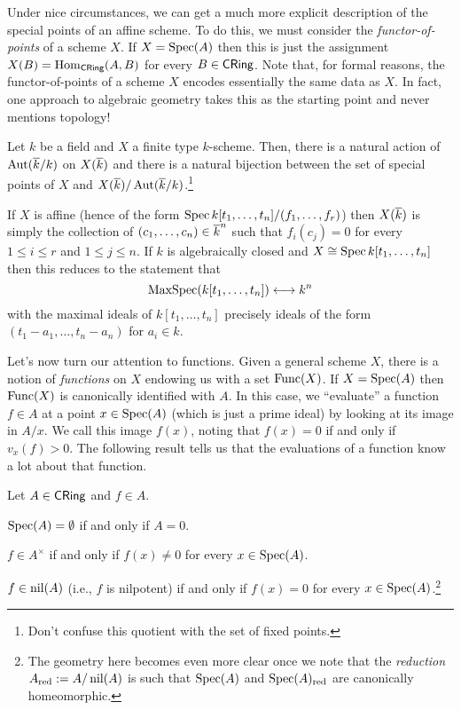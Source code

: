 \documentclass[11pt]{article}
\begin{document}
Under nice circumstances, we can get a much more explicit description of the special points of an affine scheme. To do this, we must consider the \emph{functor-of-points} of a scheme $X$. If $X=\operatorname{Spec}(A)$ then this is just the assignment $X(B)=\operatorname{Hom}_{\operatorname{\mathsf{CRing}}}(A,B)$ for every $B\in\operatorname{\mathsf{CRing}}$. Note that, for formal reasons, the functor-of-points of a scheme $X$ encodes essentially the same data as $X$. In fact, one approach to algebraic geometry takes this as the starting point and never mentions topology!

\begin{proposition}
Let $k$ be a field and $X$ a finite type $k$-scheme. Then, there is a natural action of $\operatorname{Aut}(\overline{k}/k)$ on $X(\overline{k})$ and there is a natural bijection between the set of special points of $X$ and $X(\overline{k})/\operatorname{Aut}(\overline{k}/k)$.\footnote{Don't confuse this quotient with the set of fixed points.}
\end{proposition}

If $X$ is affine (hence of the form $\operatorname{Spec} k[t_1,\ldots,t_n]/(f_1,\ldots,f_r)$) then $X(\overline{k})$ is simply the collection of $(c_1,\ldots,c_n)\in\overline{k}^n$ such that $f_i(c_j)=0$ for every $1\leq i\leq r$ and $1\leq j\leq n$. If $k$ is algebraically closed and $X\cong\operatorname{Spec} k[t_1,\ldots,t_n]$ then this reduces to the statement that 
$$\operatorname{MaxSpec}(k[t_1,\ldots,t_n])\longleftrightarrow k^n$$ 
with the maximal ideals of $k[t_1,\ldots,t_n]$ precisely ideals of the form $(t_1-a_1,\ldots,t_n-a_n)$ for $a_i\in k$.

Let's now turn our attention to functions. Given a general scheme $X$, there is a notion of \emph{functions} on $X$ endowing us with a set $\operatorname{Func}(X)$. If $X=\operatorname{Spec}(A)$ then $\operatorname{Func}(X)$ is canonically identified with $A$. In this case, we ``evaluate'' a function $f\in A$ at a point $x\in\operatorname{Spec}(A)$ (which is just a prime ideal) by looking at its image in $A/x$. We call this image $f(x)$, noting that $f(x)=0$ if and only if $v_x(f)>0$. The following result tells us that the evaluations of a function know a lot about that function.

\begin{proposition}
Let $A\in\operatorname{\mathsf{CRing}}$ and $f\in A$.
\begin{enum}{\alph}
\item $\operatorname{Spec}(A)=\emptyset$ if and only if $A=0$.

\item $f\in A^{\times}$ if and only if $f(x)\neq0$ for every $x\in\operatorname{Spec}(A)$.

\item $f\in\operatorname{nil}(A)$ (i.e., $f$ is nilpotent) if and only if $f(x)=0$ for every $x\in\operatorname{Spec}(A)$.\footnote{The geometry here becomes even more clear once we note that the \emph{reduction} $A_{\operatorname{red}}:=A/\operatorname{nil}(A)$ is such that $\operatorname{Spec}(A)$ and $\operatorname{Spec}(A)_{\operatorname{red}}$ are canonically homeomorphic.}
\end{enum}
\end{proposition}
\end{document}
